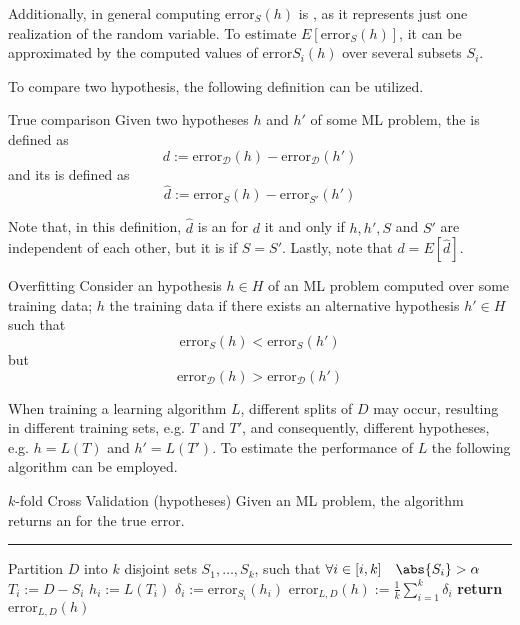 \documentclass[a4paper, 12pt]{report}
\begin{document}
    Additionally, in general computing $\mathrm{error}_S(h)$ is , as it represents just one realization of the random variable. To estimate $E[\mathrm{error}_S(h)]$, it can be approximated by  the computed values of $\mathrm{error}{S_i}(h)$ over several subsets $S_i$.

    To compare two hypothesis, the following definition can be utilized.

    \begin{frameddefn}{True comparison}
        Given two hypotheses $h$ and $h'$ of some ML problem, the  is defined as $$d := \mathrm{error}_\mathcal D(h) - \mathrm{error}_\mathcal D(h')$$ and its  is defined as $$\hat d := \mathrm{error}_{S}(h) - \mathrm{error}_{S'}(h')$$
    \end{frameddefn}

    Note that, in this definition, $\hat d$ is an  for $d$ it and only if $h, h', S$ and $S'$ are independent of each other, but it is  if $S = S'$. Lastly, note that $d = E[\hat d]$.
    
    \begin{frameddefn}{Overfitting}
        Consider an hypothesis $h \in H$ of an ML problem computed over some training data; $h$  the training data if there exists an alternative hypothesis $h' \in H$ such that $$\mathrm{error}_S(h) < \mathrm{error}_S(h')$$ but $$\mathrm{error}_\mathcal D(h) > \mathrm{error}_\mathcal D(h')$$
    \end{frameddefn}

    When training a learning algorithm $L$, different splits of $D$ may occur, resulting in different training sets, e.g. $T$ and $T'$, and consequently, different hypotheses, e.g. $h= L(T)$ and $h'= L(T')$. To estimate the performance of $L$ the following algorithm can be employed.

    \begin{framedalgo}{$k$-fold Cross Validation (hypotheses)}
        Given an ML problem, the algorithm returns an  for the true error. \\
        \hrule
        \quad
        \label{alg:k-fold1}
        \begin{algorithmic}[1]
                \State Partition $D$ into $k$ disjoint sets $S_1, \ldots , S_k$, such that $\forall i \in [i, k] \quad \abs{S_i} > \alpha$
                    \State $T_i := D - S_i$ 
                    \State $h_i := L(T_i)$
                    \State $\delta_i := \mathrm{error}_{S_i}(h_i)$
                \EndFor
                \State $\mathrm{error}_{L, D}(h) := \frac{1}{k} \sum_{i = 1}^k{\delta_i}$
                \State \textbf{return} $\mathrm{error}_{L, D}(h)$
            \EndFunction
        \end{algorithmic}
    \end{framedalgo}
\end{document}
